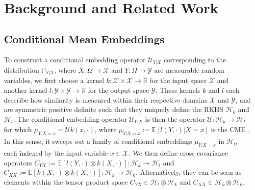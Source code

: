 \documentclass{llncs}
\begin{document}
	
	\section{Background and Related Work}
	\label{sec:background}
	
	\subsection{Conditional Mean Embeddings}
	
	To construct a conditional embedding operator $\mathcal{U}_{Y | X}$ corresponding to the distribution $\mathbb{P}_{Y | X}$, where $X : \Omega \to \mathcal{X}$ and $Y: \Omega \to \mathcal{Y}$ are measurable random variables, we first choose a kernel $k : \mathcal{X} \times \mathcal{X} \to \mathbb{R}$ for the input space $\mathcal{X}$ and another kernel $l : \mathcal{Y} \times \mathcal{Y} \to \mathbb{R}$ for the output space $\mathcal{Y}$. These kernels $k$ and $l$ each describe how similarity is measured within their respective domains $\mathcal{X}$ and $\mathcal{Y}$, and are symmetric positive definite such that they uniquely define the \gls{RKHS} $\mathcal{H}_{k}$ and $\mathcal{H}_{l}$. The conditional embedding operator $\mathcal{U}_{Y | X}$ is then the operator $\mathcal{U} : \mathcal{H}_{k} \to \mathcal{H}_{l}$ for which $\mu_{Y | X = x} = \mathcal{U} k(x, \cdot)$, where $\mu_{Y | X = x} := \mathbb{E}[l(Y, \cdot) | X = x]$ is the \gls{CME} \citep{song2009hilbert}. In this sense, it sweeps out a family of conditional embeddings $\mu_{Y | X = x}$ in $\mathcal{H}_{l}$, each indexed by the input variable $x \in \mathcal{X}$. We then define cross covariance operators $C_{YX} := \mathbb{E}[l(Y, \cdot) \otimes k(X, \cdot)] : \mathcal{H}_{k} \to \mathcal{H}_{l}$ and $C_{XX} := \mathbb{E}[k(X, \cdot) \otimes k(X, \cdot)] : \mathcal{H}_{k} \to \mathcal{H}_{k}$. Alternatively, they can be seen as elements within the tensor product space $C_{YX} \in \mathcal{H}_{l} \otimes \mathcal{H}_{k}$ and $C_{XX} \in \mathcal{H}_{k} \otimes \mathcal{H}_{k}$.
	
\end{document}
